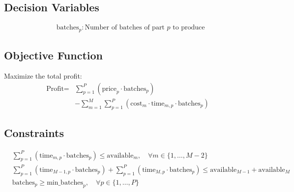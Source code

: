 \documentclass{article}
\begin{document}
\subsection*{Decision Variables}
\begin{align*}
& \text{batches}_{p}: \text{Number of batches of part } p \text{ to produce}
\end{align*}

\subsection*{Objective Function}
Maximize the total profit:
\begin{align*}
\text{Profit} = & \sum_{p=1}^{P} \left( \text{price}_{p} \cdot \text{batches}_{p} \right) \\
& - \sum_{m=1}^{M} \sum_{p=1}^{P} \left( \text{cost}_{m} \cdot \text{time}_{m,p} \cdot \text{batches}_{p} \right)
\end{align*}

\subsection*{Constraints}
\begin{align*}
& \sum_{p=1}^{P} \left( \text{time}_{m,p} \cdot \text{batches}_{p} \right) \leq \text{available}_{m}, \quad \forall m \in \{1, \ldots, M-2\} \\
& \sum_{p=1}^{P} \left( \text{time}_{M-1,p} \cdot \text{batches}_{p} \right) + \sum_{p=1}^{P} \left( \text{time}_{M,p} \cdot \text{batches}_{p} \right) \leq \text{available}_{M-1} + \text{available}_{M} \\
& \text{batches}_{p} \geq \text{min\_batches}_{p}, \quad \forall p \in \{1, \ldots, P\}
\end{align*}
\end{document}
